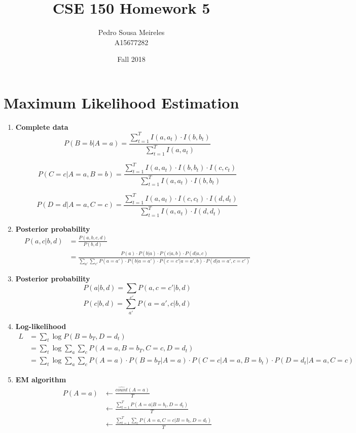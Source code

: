 \documentclass[11]{article}
\title{CSE 150 Homework 5}
\date{Fall 2018}
\author{Pedro Sousa Meireles\\ A15677282}
\begin{document}
\maketitle
\section{Maximum Likelihood Estimation}
\begin{enumerate}[label=(\alph*)]
\item{\textbf{Complete data}}
$$P(B=b|A=a)=\frac{\sum_{t=1}^T I(a,a_t) \cdot I(b,b_t)}{\sum_{t=1}^T I(a,a_t)}$$

$$P(C=c|A=a,B=b)=\frac{\sum_{t=1}^T I(a,a_t) \cdot I(b,b_t) \cdot I(c,c_t)}{\sum_{t=1}^T I(a,a_t) \cdot I(b,b_t)}$$

$$P(D=d|A=a,C=c)=\frac{\sum_{t=1}^T I(a,a_t) \cdot I(c,c_t) \cdot I(d,d_t)}{\sum_{t=1}^T I(a,a_t) \cdot I(d,d_t)}$$

\item{\textbf{Posterior probability}}
\begin{align*}
P(a,c|b,d)&=\frac{P(a,b,c,d)}{P(b,d)}\\
&=\frac{P(a) \cdot P(b|a) \cdot P(c|a,b) \cdot P(d|a,c)}{\sum_{a'} \sum_{c'} P(a=a') \cdot P(b|a=a') \cdot P(c=c'|a=a',b) \cdot P(d|a=a',c=c')}
\end{align*}

\item{\textbf{Posterior probability}}
$$P(a|b,d)=\sum_{c'} P(a,c=c'|b,d)$$
$$P(c|b,d)=\sum_{a'} P(a=a',c|b,d)$$

\item{\textbf{Log-likelihood}}
\begin{align*}
L&=\sum_t \log{P(B=b_T,D=d_t)}\\
&=\sum_t \log{\sum_a \sum_c P(A=a,B=b_T,C=c,D=d_t)} \\
&=\sum_t \log{\sum_a \sum_c P(A=a) \cdot P(B=b_T|A=a) \cdot P(C=c|A=a, B=b_t) \cdot P(D=d_t|A=a,C=c)}
\end{align*}

\item{\textbf{EM algorithm}}
\begin{align*}
P(A=a) &\longleftarrow \frac{\widehat{count}(A=a)}{T}\\
&\longleftarrow \frac{\sum_{t=1}^T P(A=a|B=b_t,D=d_t)}{T}\\
&\longleftarrow \frac{\sum_{t=1}^T \sum_c P(A=a,C=c|B=b_t,D=d_t)}{T}
\end{align*}


\end{enumerate}
\end{document}
